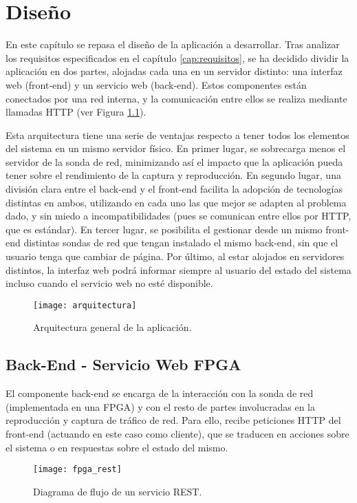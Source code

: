 \chapter{Diseño\label{cap:disenho}}

En este capítulo se repasa el diseño de la aplicación a desarrollar.
Tras analizar los requisitos especificados en el capítulo \ref{cap:requisitos}, se ha decidido dividir la aplicación en dos partes, alojadas cada una en un servidor distinto: una interfaz web (\gls{front-end}) y un servicio web (\gls{back-end}).
Estos componentes están conectados por una red interna, y la comunicación entre ellos se realiza mediante llamadas  \gls{HTTP} (ver Figura \ref{fig:arquitectura}).

Esta arquitectura tiene una serie de ventajas respecto a tener todos los elementos del sistema en un mismo servidor físico.
En primer lugar, se sobrecarga menos el servidor de la sonda de red, minimizando así el impacto que la aplicación pueda tener sobre el rendimiento de la captura y reproducción.
En segundo lugar, una división clara entre el \gls{back-end} y el \gls{front-end} facilita la adopción de tecnologías distintas en ambos, utilizando en cada uno las que mejor se adapten al problema dado, y sin miedo a incompatibilidades (pues se comunican entre ellos por \gls{HTTP}, que es estándar).
En tercer lugar, se posibilita el gestionar desde un mismo \gls{front-end} distintas sondas de red que tengan instalado el mismo \gls{back-end}, sin que el usuario tenga que cambiar de página.
Por último, al estar alojados en servidores distintos, la interfaz web podrá informar siempre al usuario del estado del sistema incluso cuando el servicio web no esté disponible.

\begin{figure}[!htp]
  \centering
  \texttt{[image: arquitectura]}
  \caption{Arquitectura general de la aplicación.}
  \label{fig:arquitectura}
\end{figure}


\section{Back-End - Servicio Web FPGA\label{sec:dis:servicio_web_fpga}}

El componente \gls{back-end} se encarga de la interacción con la sonda de red (implementada en una \gls{FPGA}) y con el resto de partes involucradas en la reproducción y captura de tráfico de red.
Para ello, recibe peticiones \gls{HTTP} del \gls{front-end} (actuando en este caso como cliente), que se traducen en acciones sobre el sistema o en respuestas sobre el estado del mismo.
\begin{figure}[!htp]
  \centering
  \texttt{[image: fpga\_rest]}
  \caption{Diagrama de flujo de un servicio \gls{REST}.}
  \label{fig:fpga_rest}
\end{figure}

